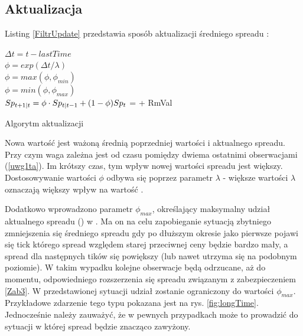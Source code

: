 \documentclass[a4paper,12pt,openany, DIV=calc, headsepline]{scrbook}
\begin{document}

\subsection{Aktualizacja \MSpn}

Listing \ref{FiltrUpdate} przedstawia sposób aktualizacji średniego spreadu \MSpn:
\IncMargin{5em}
\begin{algorithm}

{ $\Delta t = t - lastTime$\\
\label{uwg1ta}	$\phi = exp(\Delta t / \lambda)$\\
\label{uwg2ta}	$\phi = max(\phi, \phi_{min})$\\
\label{uwg3ta} 	$\phi = min(\phi, \phi_{max})$ \\ 
\label{line:akt}	$Sp_{t+1|t} = \phi \cdot Sp_{t|t-1} + (1 - \phi) Sp_{t}$
}
{
\label{Zab3} \MSpn = \MSpc + RmVal\\
}
\DecMargin{5em}

\caption{Algorytm aktualizacji \MSpn \label{FiltrUpdate}}
\end{algorithm}

Nowa wartość \MSpn jest ważoną średnią poprzedniej wartości i aktualnego spreadu. Przy czym  waga \Spt zależna jest od czasu pomiędzy dwiema ostatnimi obserwacjami (\ref{uwg1ta}). Im krótszy czas, tym wpływ nowej wartości spreadu jest większy. Dostosowywanie wartości $\phi$ odbywa się poprzez parametr $\lambda$ - większe wartości $\lambda$ oznaczają większy wpływ \Spt na wartość \MSpn. 

Dodatkowo wprowadzono parametr $\phi_{max}$, określający maksymalny udział aktualnego spreadu (\Spt) w \MSpn. Ma on na celu zapobieganie sytuacją zbytniego zmniejszenia się średniego spreadu gdy po dłuższym okresie jako pierwsze pojawi się tick którego spread względem starej przeciwnej ceny będzie bardzo mały, a spread dla następnych tików się powiększy (lub nawet utrzyma się na podobnym poziomie). W takim wypadku kolejne obserwacje będą odrzucane, aż do momentu, odpowiedniego rozszerzenia się spreadu związanym z zabezpieczeniem \ref{Zab3}. W przedstawionej sytuacji udział \Spt zostanie ograniczony do wartości $\phi_{max}$. Przykładowe zdarzenie tego typu pokazana jest na rys. \ref{fig:longTime}. Jednocześnie należy zauważyć, że w pewnych przypadkach może to prowadzić do sytuacji w której spread będzie znacząco zawyżony. 
\end{document}
